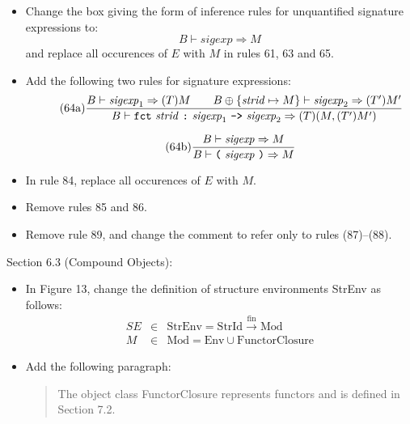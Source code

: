 \documentclass[twoside,titlepage]{article}
\newcommand{\finto}{\ensuremath{\xrightarrow{\text{fin}}}}
\begin{document}
\begin{appendix}
\begin{itemize}
\item Change the box giving the form of inference rules for unquantified signature expressions to:
  $$
  \boxed{B \vdash \mathit{sigexp} \Rightarrow M}
  $$
  and replace all occurences of $E$ with $M$ in rules 61, 63 and 65.

\item Add the following two rules for signature expressions:
  \begin{equation}
  \tag{64a}
  \frac{
  B \vdash \mathit{sigexp}_1 \Rightarrow (T)M
  \qquad
  B \oplus \{\mathit{strid}\mapsto M\} \vdash \mathit{sigexp}_2 \Rightarrow (T')M'
  }{
  B \vdash {\tt{fct}}~\mathit{strid}~\mbox{\tt:}~\mathit{sigexp}_1~\mbox{\tt->}~\mathit{sigexp}_2 \Rightarrow (T)(M,(T')M')
  }
  \end{equation}

  \begin{equation}
  \tag{64b}
  \frac{
  B \vdash \mathit{sigexp} \Rightarrow M
  }{
  B \vdash \mbox{\tt(}~\mathit{sigexp}~\mbox{\tt)} \Rightarrow M
  }
  \end{equation}

\item In rule 84, replace all occurences of $E$ with $M$.

\item Remove rules 85 and 86.

\item Remove rule 89, and change the comment to refer only to rules (87)--(88).
\end{itemize}

Section 6.3 (Compound Objects):
\begin{itemize}
\item In Figure 13, change the definition of structure environments StrEnv as follows:
  \begin{eqnarray*}
  \mathit{SE} &\in& \mbox{StrEnv} = \mbox{StrId} \finto \mbox{Mod} \\
  M &\in& \mbox{Mod} = \mbox{Env} \cup \mbox{FunctorClosure}
  \end{eqnarray*}

\item Add the following paragraph:
  \begin{quote}
  The object class FunctorClosure represents functors and is defined in Section 7.2.
  \end{quote}
\end{itemize}


\end{appendix}
\end{document}

